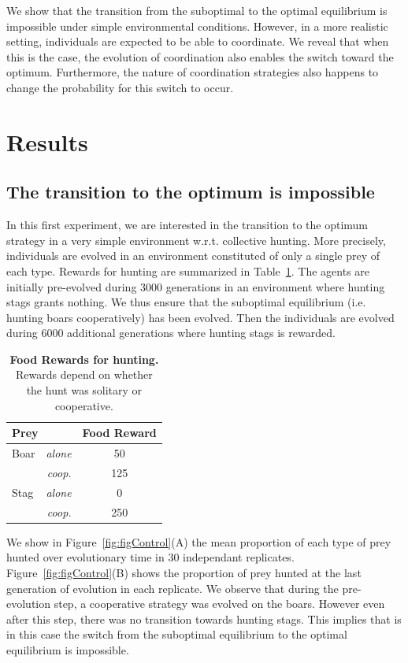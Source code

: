 We show that the transition from the suboptimal to the optimal equilibrium is impossible under simple environmental conditions. However, in a more realistic setting, individuals are expected to be able to coordinate. We reveal that when this is the case, the evolution of coordination also enables the switch toward the optimum. Furthermore, the nature of coordination strategies also happens to change the probability for this switch to occur.

\section{Results}
  \subsection{The transition to the optimum is impossible}
    In this first experiment, we are interested in the transition to the optimum strategy in a very simple environment w.r.t. collective hunting. More precisely, individuals are evolved in an environment constituted of only a single prey of each type. Rewards for hunting are summarized in Table~\ref{table:tableRewards}. The agents are initially pre-evolved during $3000$ generations in an environment where hunting stags grants nothing. We thus ensure that the suboptimal equilibrium (i.e. hunting boars cooperatively) has been evolved. Then the individuals are evolved during $6000$ additional generations where hunting stags is rewarded.

    \begin{table}[ht]
      \centering
        \begin{tabular}{|l|r|c|}
          \hline
          \multicolumn{2}{|l|}{\textbf{Prey}} & \textbf{Food Reward} \\
          \hline
          Boar & \textit{alone} & 50 \\
          \hline
          & \textit{coop.} & 125 \\
          \hline
          Stag & \textit{alone} & 0 \\
          \hline
          & \textit{coop.} & 250 \\
          \hline
        \end{tabular}
        \caption{\textbf{Food Rewards for hunting.}
        Rewards depend on whether the hunt was solitary or cooperative.}
      \label{table:tableRewards}
    \end{table}

    We show in Figure~\ref{fig:figControl}(A) the mean proportion of each type of prey hunted over evolutionary time in $30$ independant replicates. Figure~\ref{fig:figControl}(B) shows the proportion of prey hunted at the last generation of evolution in each replicate. We observe that during the pre-evolution step, a cooperative strategy was evolved on the boars. However even after this step, there was no transition towards hunting stags. This implies that is in this case the switch from the suboptimal equilibrium to the optimal equilibrium is impossible. 

